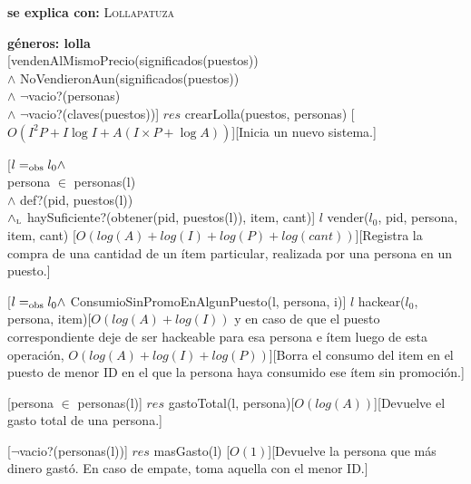 \documentclass[../main.tex]{subfiles}
\begin{document}
\begin{interfaz}{
    \textbf{se explica con: }\textsc{Lollapatuza} \par\vspace{-3mm}
    \textbf{géneros: lolla} \\
    
    [vendenAlMismoPrecio(significados(puestos)) \\
    $\land$ NoVendieronAun(significados(puestos)) \\
    $\land$ $\neg$vacio?(personas) \\ 
    $\land$ $\neg$vacio?(claves(puestos))]
    {$res$ \igobs crearLolla(puestos, personas)}
    [$O(I^2P + I \log I + A(I \times P + \log A))$][Inicia un nuevo sistema.]   
    
    [$l =_{\mathrm{obs}} l_0 \land$ \\
    persona $\in$ personas(l) \\
    $\land$ def?(pid, puestos(l))\\
    $\land_{\mathrm{\scriptscriptstyle{L}}}$ haySuficiente?(obtener(pid, puestos(l)), item, cant)]
    {$l$ \igobs vender($l_0$, pid, persona, item, cant)}
    [$O(log(A) + log(I) + log(P) + log(cant))$][Registra la compra de una cantidad de un ítem particular, realizada por una persona en un puesto.]   
    
    [$l =_{\mathrm{obs}} l_0 \land $
    ConsumioSinPromoEnAlgunPuesto(l, persona, i)]
    {$l$ \igobs hackear($l_0$, persona, item)}[$O(log(A) + log(I))$ y en caso de que el puesto correspondiente
    deje de ser hackeable para esa persona e ítem luego de esta operación, 
    $O(log(A) + log(I) + log(P))$][Borra el consumo del item en el puesto de menor ID en el que la persona haya consumido ese ítem sin promoción.]   
    
    [persona  $\in$ personas(l)]
    {$res$ \igobs gastoTotal(l, persona)}[$O(log (A))$][Devuelve el gasto total de una persona.]   
    
    [$\neg$vacio?(personas(l))]
    {$res$ \igobs masGasto(l)}
    [$O(1)$][Devuelve la persona que más dinero gastó. En caso de empate, toma aquella con el menor ID.]   
    
}
\end{interfaz}
\end{document}
